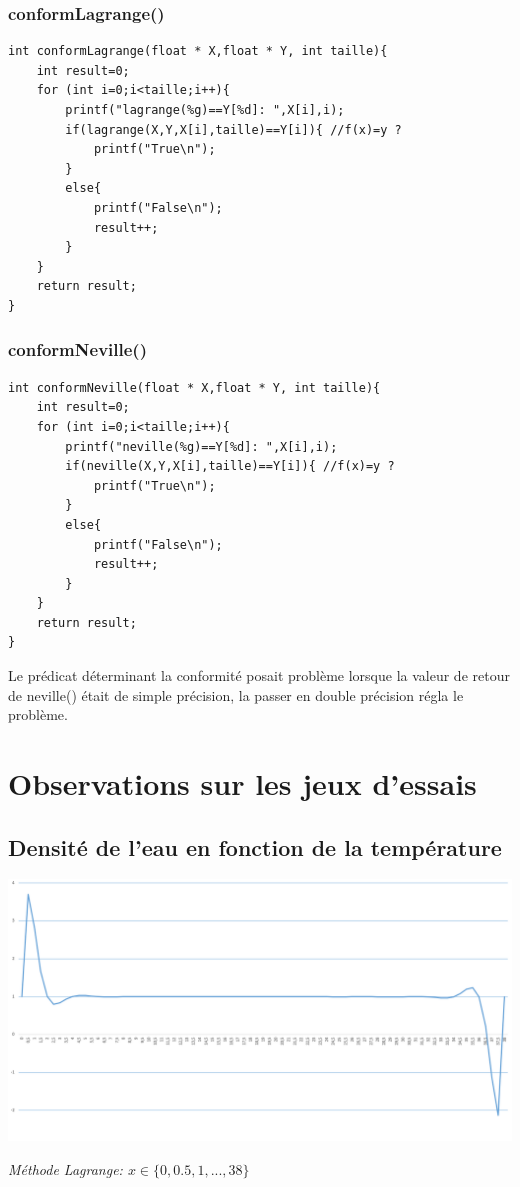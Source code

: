 \documentclass[10pt,a4paper,french]{article}
\begin{document}
\subsubsection{conformLagrange()}
\begin{lstlisting}
int conformLagrange(float * X,float * Y, int taille){
    int result=0;
    for (int i=0;i<taille;i++){
        printf("lagrange(%g)==Y[%d]: ",X[i],i);
        if(lagrange(X,Y,X[i],taille)==Y[i]){ //f(x)=y ?
            printf("True\n");
        }
        else{
            printf("False\n");
            result++;
        }
    }
    return result;
}
\end{lstlisting}
\subsubsection{conformNeville()}\label{double}
\begin{lstlisting}
int conformNeville(float * X,float * Y, int taille){
    int result=0;
    for (int i=0;i<taille;i++){
        printf("neville(%g)==Y[%d]: ",X[i],i);
        if(neville(X,Y,X[i],taille)==Y[i]){ //f(x)=y ?
            printf("True\n");
        }
        else{
            printf("False\n");
            result++;
        }
    }
    return result;
}
\end{lstlisting}
Le prédicat déterminant la conformité posait problème lorsque la valeur de retour de neville() était de simple précision, la passer en double précision régla le problème.
\section{Observations sur les jeux d'essais}
\subsection{Densité de l'eau en fonction de la température}

\begin{center}
\includegraphics[scale=0.25]{ressources/lagrange_1.PNG}
\end{center}
\begin{center}
\textit{Méthode Lagrange: $x\in \{0,0.5,1,...,38\}$ }
\end{center}
\end{document}
